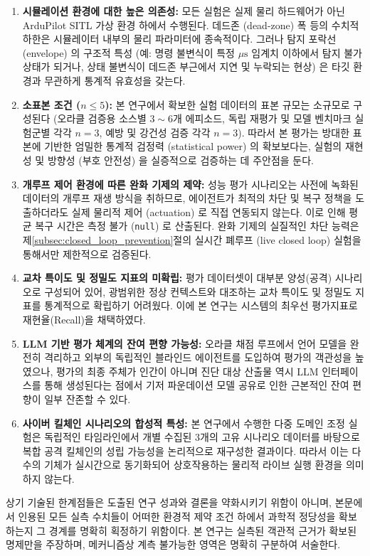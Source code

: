\begin{enumerate}[leftmargin=*]
    \item \textbf{시뮬레이션 환경에 대한 높은 의존성:} 모든 실험은 실제 물리 하드웨어가 아닌 ArduPilot SITL 가상 환경 하에서 수행된다. 데드존 (dead-zone) 폭 등의 수치적 하한은 시뮬레이터 내부의 물리 파라미터에 종속적이다. 그러나 탐지 포락선 (envelope) 의 구조적 특성 (예: 명령 불변식이 특정 $\mu\text{s}$ 임계치 이하에서 탐지 불가 상태가 되거나, 상태 불변식이 데드존 부근에서 지연 및 누락되는 현상) 은 타깃 환경과 무관하게 통계적 유효성을 갖는다.
    
    \item \textbf{소표본 조건 ($n \le 5$):} 본 연구에서 확보한 실험 데이터의 표본 규모는 소규모로 구성된다 (오라클 검증용 소스별 $3\sim6$개 에피소드, 독립 재평가 및 모델 벤치마크 실험군별 각각 $n=3$, 예방 및 강건성 검증 각각 $n=3$). 따라서 본 평가는 방대한 표본에 기반한 엄밀한 통계적 검정력 (statistical power) 의 확보보다는, 실험의 재현성 및 방향성 (부호 안전성) 을 실증적으로 검증하는 데 주안점을 둔다. 
    
    \item \textbf{개루프 제어 환경에 따른 완화 기제의 제약:} 성능 평가 시나리오는 사전에 녹화된 데이터의 개루프 재생 방식을 취하므로, 에이전트가 최적의 차단 및 복구 정책을 도출하더라도 실제 물리적 제어 (actuation) 로 직접 연동되지 않는다. 이로 인해 평균 복구 시간은 측정 불가 (\texttt{null}) 로 산출된다. 완화 기제의 실질적인 차단 능력은 제\ref{subsec:closed_loop_prevention}절의 실시간 폐루프 (live closed loop) 실험을 통해서만 제한적으로 검증된다.
    
    \item \textbf{교차 특이도 및 정밀도 지표의 미확립:} 평가 데이터셋이 대부분 양성(공격) 시나리오로 구성되어 있어, 광범위한 정상 컨텍스트와 대조하는 교차 특이도 및 정밀도 지표를 통계적으로 확립하기 어려웠다. 이에 본 연구는 시스템의 최우선 평가지표로 재현율(Recall)을 채택하였다.
    
    \item \textbf{LLM 기반 평가 체계의 잔여 편향 가능성:} 오라클 채점 루프에서 언어 모델을 완전히 격리하고 외부의 독립적인 블라인드 에이전트를 도입하여 평가의 객관성을 높였으나, 평가의 최종 주체가 인간이 아니며 진단 대상 산출물 역시 LLM 인터페이스를 통해 생성된다는 점에서 기저 파운데이션 모델 공유로 인한 근본적인 잔여 편향이 일부 잔존할 수 있다.
    
    \item \textbf{사이버 킬체인 시나리오의 합성적 특성:} 본 연구에서 수행한 다중 도메인 조정 실험은 독립적인 타임라인에서 개별 수집된 3개의 고유 시나리오 데이터를 바탕으로 복합 공격 킬체인의 성립 가능성을 논리적으로 재구성한 결과이다. 따라서 이는 다수의 기체가 실시간으로 동기화되어 상호작용하는 물리적 라이브 실행 환경을 의미하지 않는다.
\end{enumerate}

\noindent 상기 기술된 한계점들은 도출된 연구 성과와 결론을 약화시키기 위함이 아니며, 본문에서 인용된 모든 실측 수치들이 어떠한 환경적 제약 조건 하에서 과학적 정당성을 확보하는지 그 경계를 명확히 획정하기 위함이다. 본 연구는 실측된 객관적 근거가 확보된 명제만을 주장하며, 메커니즘상 계측 불가능한 영역은 명확히 구분하여 서술한다.